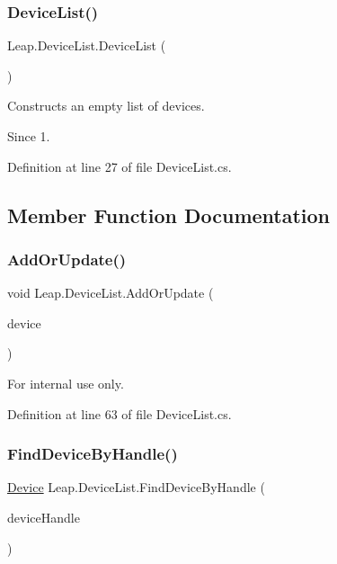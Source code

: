 \subsubsection{\texorpdfstring{DeviceList()}{DeviceList()}}
{\footnotesize\ttfamily Leap.\+Device\+List.\+Device\+List (\begin{DoxyParamCaption}{ }\end{DoxyParamCaption})}



Constructs an empty list of devices. 

\begin{DoxySince}{Since}
1. 
\end{DoxySince}


Definition at line 27 of file Device\+List.\+cs.



\subsection{Member Function Documentation}
\mbox{\label{class_leap_1_1_device_list_aaa399a6ea7549f315760300e5f07fa19}} 
\subsubsection{\texorpdfstring{AddOrUpdate()}{AddOrUpdate()}}
{\footnotesize\ttfamily void Leap.\+Device\+List.\+Add\+Or\+Update (\begin{DoxyParamCaption}\item[{\mbox{\hyperlink{class_leap_1_1_device}{Device}}}]{device }\end{DoxyParamCaption})}



For internal use only. 



Definition at line 63 of file Device\+List.\+cs.

\mbox{\label{class_leap_1_1_device_list_a99b8acd4484498cc197520a89f287f78}} 
\subsubsection{\texorpdfstring{FindDeviceByHandle()}{FindDeviceByHandle()}}
{\footnotesize\ttfamily \mbox{\hyperlink{class_leap_1_1_device}{Device}} Leap.\+Device\+List.\+Find\+Device\+By\+Handle (\begin{DoxyParamCaption}\item[{Int\+Ptr}]{device\+Handle }\end{DoxyParamCaption})}



